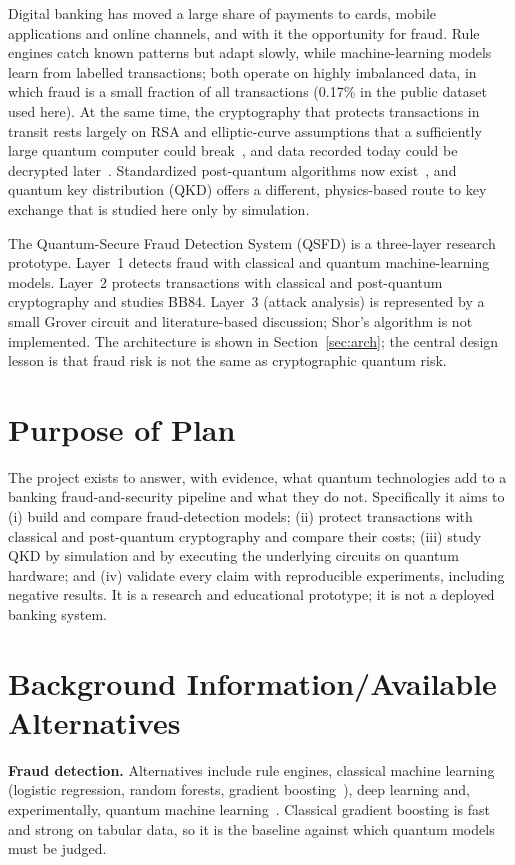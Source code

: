 Digital banking has moved a large share of payments to cards, mobile applications and online channels, and with it the opportunity for fraud. Rule engines catch known patterns but adapt slowly, while machine-learning models learn from labelled transactions; both operate on highly imbalanced data, in which fraud is a small fraction of all transactions (0.17\% in the public dataset used here). At the same time, the cryptography that protects transactions in transit rests largely on RSA and elliptic-curve assumptions that a sufficiently large quantum computer could break~\cite{shor}, and data recorded today could be decrypted later~\cite{mosca}. Standardized post-quantum algorithms now exist~\cite{nist203,nist204,nist205}, and quantum key distribution (QKD) offers a different, physics-based route to key exchange that is studied here only by simulation.

The Quantum-Secure Fraud Detection System (QSFD) is a three-layer research prototype. Layer~1 detects fraud with classical and quantum machine-learning models. Layer~2 protects transactions with classical and post-quantum cryptography and studies BB84. Layer~3 (attack analysis) is represented by a small Grover circuit and literature-based discussion; Shor's algorithm is not implemented. The architecture is shown in Section~\ref{sec:arch}; the central design lesson is that fraud risk is not the same as cryptographic quantum risk.

\section{Purpose of Plan}
The project exists to answer, with evidence, what quantum technologies add to a banking fraud-and-security pipeline and what they do not. Specifically it aims to (i) build and compare fraud-detection models; (ii) protect transactions with classical and post-quantum cryptography and compare their costs; (iii) study QKD by simulation and by executing the underlying circuits on quantum hardware; and (iv) validate every claim with reproducible experiments, including negative results. It is a research and educational prototype; it is not a deployed banking system.

\section{Background Information/Available Alternatives}
\textbf{Fraud detection.} Alternatives include rule engines, classical machine learning (logistic regression, random forests, gradient boosting~\cite{xgboost}), deep learning and, experimentally, quantum machine learning~\cite{havlicek,schuld}. Classical gradient boosting is fast and strong on tabular data, so it is the baseline against which quantum models must be judged.

